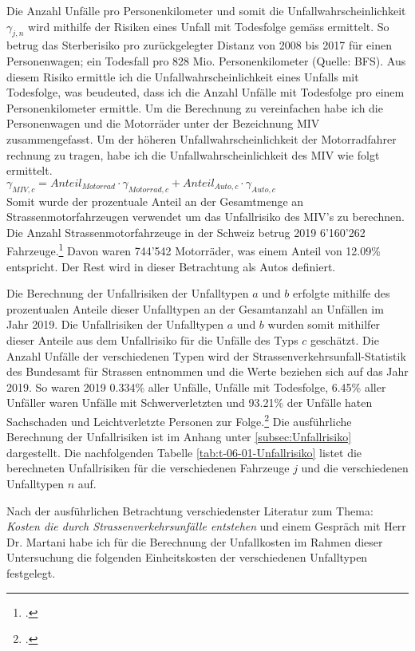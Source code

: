 Die Anzahl Unfälle pro Personenkilometer und somit die Unfallwahrscheinlichkeit \( \gamma_{j,n} \) wird mithilfe der Risiken eines Unfall mit Todesfolge gemäss \cite{Unfallrisiko2019} ermittelt. 
So betrug das Sterberisiko pro zurückgelegter Distanz von 2008 bis 2017 für einen Personenwagen; ein Todesfall pro 828 Mio. Personenkilometer (Quelle: BFS). Aus diesem Risiko ermittle ich die Unfallwahrscheinlichkeit eines Unfalls mit Todesfolge, was beudeuted, dass ich die Anzahl Unfälle mit Todesfolge pro einem Personenkilometer ermittle. 
Um die Berechnung zu vereinfachen habe ich die Personenwagen und die Motorräder unter der Bezeichnung MIV zusammengefasst. Um der höheren Unfallwahrscheinlichkeit der Motorradfahrer rechnung zu tragen, habe ich die Unfallwahrscheinlichkeit des MIV wie folgt ermittelt. \\
$\gamma_{MIV,c} = Anteil_{Motorrad} \cdot \gamma_{Motorrad,c} + Anteil_{Auto,c} \cdot \gamma_{Auto,c}$ \\
Somit wurde der prozentuale Anteil an der Gesamtmenge an Strassenmotorfahrzeugen verwendet um das Unfallrisiko des MIV's zu berechnen.
Die Anzahl Strassenmotorfahrzeuge in der Schweiz betrug 2019 6'160'262 Fahrzeuge.\footcite[Vlg.]{Bestand2019}
Davon waren 744'542 Motorräder, was einem Anteil von 12.09\% entspricht. Der Rest wird in dieser Betrachtung als Autos definiert. 

Die Berechnung der Unfallrisiken der Unfalltypen $a$ und $b$ erfolgte mithilfe des prozentualen Anteile dieser Unfalltypen an der Gesamtanzahl an Unfällen im Jahr 2019. Die Unfallrisiken der Unfalltypen $a$ und $b$ wurden somit mithilfer dieser Anteile aus dem Unfallrisiko für die Unfälle des Typs $c$ geschätzt.
Die Anzahl Unfälle der verschiedenen Typen wird der Strassenverkehrsunfall-Statistik des Bundesamt für Strassen entnommen und die Werte beziehen sich auf das Jahr 2019.
So waren 2019 0.334\% aller Unfälle, Unfälle mit Todesfolge, 6.45\% aller Unfäller waren Unfälle mit Schwerverletzten und 93.21\% der Unfälle haten Sachschaden und Leichtverletzte Personen zur Folge.\footcite{Unfall2019}
Die ausführliche Berechnung der Unfallrisiken ist im Anhang unter \ref{subsec:Unfallrisiko} dargestellt.
Die nachfolgenden Tabelle \ref{tab:t-06-01-Unfallrisiko} listet die berechneten Unfallrisiken für die verschiedenen Fahrzeuge $j$ und die verschiedenen Unfalltypen $n$ auf. 



\newpage

Nach der ausführlichen Betrachtung verschiedenster Literatur zum Thema: \textit{Kosten die durch Strassenverkehrsunfälle entstehen} und einem Gespräch mit Herr Dr. Martani habe ich für die Berechnung der Unfallkosten im Rahmen dieser Untersuchung die folgenden Einheitskosten der verschiedenen Unfalltypen festgelegt.


